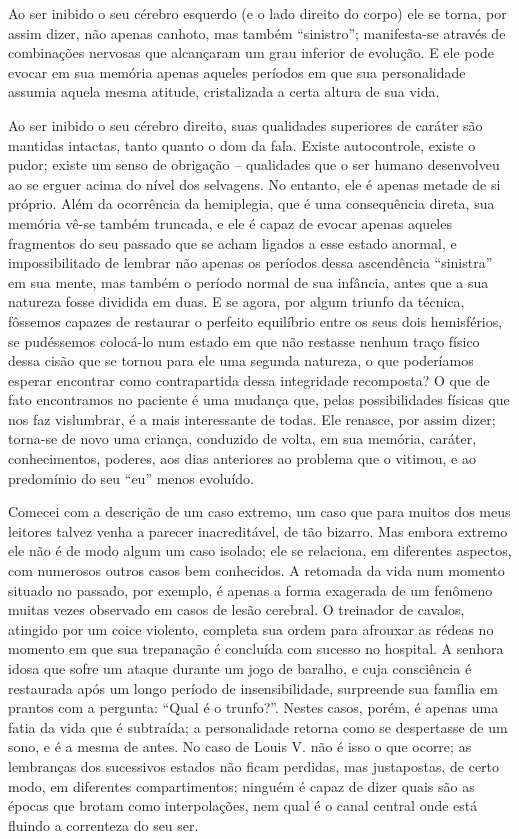 Ao ser inibido o seu cérebro esquerdo (e o lado  direito do corpo) ele
se torna, por assim dizer, não apenas canhoto, mas também “sinistro”;
manifesta-se através de combinações nervosas que alcançaram um grau
inferior de evolução.  E ele pode evocar em sua memória apenas aqueles
períodos em que sua personalidade assumia aquela mesma atitude,
cristalizada a certa altura de sua vida. 

Ao ser inibido o seu cérebro direito, suas qualidades superiores de
caráter são mantidas intactas, tanto quanto o dom da fala. Existe
autocontrole, existe o pudor; existe um senso de obrigação --
qualidades que o ser humano desenvolveu ao se erguer acima do nível dos
selvagens.  No entanto, ele é apenas metade de si próprio.  Além da
ocorrência da hemiplegia, que é uma consequência direta, sua memória
vê-se também truncada, e ele é capaz de evocar apenas aqueles
fragmentos do seu passado que se acham ligados a esse estado anormal, e
impossibilitado de lembrar não apenas os períodos dessa ascendência
“sinistra” em sua mente, mas também o período normal de sua infância,
antes que a sua natureza fosse dividida em duas.  E se agora, por algum
triunfo da técnica, fôssemos capazes de restaurar o perfeito equilíbrio
entre os seus dois hemisférios, se pudéssemos colocá-lo num estado em
que não restasse nenhum traço físico dessa cisão que se tornou para ele
uma segunda natureza, o que poderíamos esperar encontrar como
contrapartida dessa integridade recomposta?  O que de fato encontramos
no paciente é uma mudança que, pelas possibilidades físicas que nos faz
vislumbrar, é a mais interessante de todas.  Ele renasce, por assim
dizer; torna-se de novo uma criança, conduzido de volta, em sua
memória, caráter, conhecimentos, poderes, aos dias anteriores ao
problema que o vitimou, e ao predomínio do seu “eu” menos evoluído.

Comecei com a descrição de um caso extremo, um caso que para muitos dos
meus leitores talvez venha a parecer inacreditável, de tão bizarro. 
Mas embora extremo ele não é de modo algum um caso isolado; ele se
relaciona, em diferentes aspectos, com numerosos outros casos bem
conhecidos.  A retomada da vida num momento situado no passado, por
exemplo, é apenas a forma exagerada de um fenômeno muitas vezes
observado em casos de lesão cerebral.  O treinador de cavalos, atingido
por um coice violento, completa sua ordem para afrouxar as rédeas no
momento em que sua trepanação é concluída com sucesso no hospital.  A
senhora idosa que sofre um ataque durante um jogo de baralho, e cuja
consciência é restaurada após um longo período de insensibilidade,
surpreende sua família em prantos com a pergunta: “Qual é o trunfo?”. 
Nestes casos, porém, é apenas uma fatia da vida que é subtraída; a
personalidade retorna como se despertasse de um sono, e é a mesma de
antes. No caso de Louis V. não é isso o que ocorre; as lembranças dos
sucessivos estados não ficam perdidas, mas justapostas, de certo modo,
em diferentes compartimentos; ninguém é capaz de dizer quais são as
épocas que brotam como interpolações, nem qual é o canal central onde
está fluindo a correnteza do seu ser.

